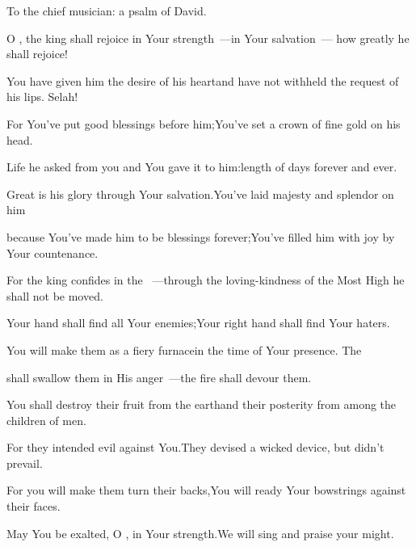 
\begin{inparaenum}
  \noindent{} To the chief musician: a psalm of David.\smallskip%
  
  \pa {} O \lord, the king shall rejoice in Your strength~---\pa in Your salvation~--- how greatly he shall rejoice!%
  
  \pa {} You have given him the desire of his heart\pa and have not withheld the request of his lips. Selah!%
  
  \pb {} For You've put good blessings before him;\pa You've set a crown of fine gold on his head.%
  
   Life he asked from you and You gave it to him:\pa length of days forever and ever.%
  
  \pa {} Great is his glory through Your salvation.\pa You've laid majesty and splendor on him%
  
  \pa {} because You've made him to be blessings forever;\pa You've filled him with joy by Your countenance.%
  
  \pb {} For the king confides in the \lord~---\pa through the loving-kindness of the Most High he shall not be moved.%
  
  \pa {} Your hand shall find all Your enemies;\pa Your right hand shall find Your haters.%
  
  \pa {} You will make them as a fiery furnace\pa in the time of Your presence. The \lord%
  
  \pb shall swallow them in His anger~---\pa the fire shall devour them.%
  
  \pa {} You shall destroy their fruit from the earth\pa and their posterity from among the children of men.%
  
  \pb {} For they intended evil against You.\pa They devised a wicked device, but didn't prevail.%
  
  \pa {} For you will make them turn their backs,\pa You will ready Your bowstrings against their faces.%
  
  \pa {} May You be exalted, O \lord, in Your strength.\pa We will sing and praise your might.%
\end{inparaenum}
